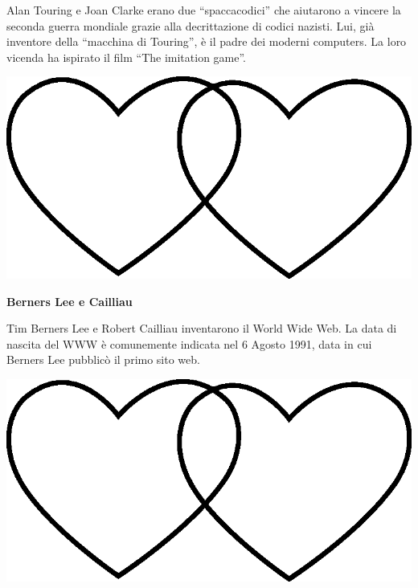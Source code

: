 \documentclass[11pt]{extarticle}
\begin{document}
\begin{center}
Alan Touring e Joan Clarke erano due “spaccacodici” che aiutarono a vincere la seconda guerra mondiale grazie alla decrittazione di codici nazisti. Lui, già inventore della “macchina di Touring”, è il padre dei moderni computers. La loro vicenda ha ispirato il film “The imitation game”.\\
\begin{center}
\includegraphics[scale=0.1]{img/cuori_venn.eps}\\
\end{center}
\end{center}
\vspace*{\fill}
\newpage
\begin{center}
\vspace*{\fill}
{\Huge \textbf{Berners Lee e Cailliau\\}}
\vspace*{\fill}
\end{center}
\newpage
{}
\vspace*{\fill}
\begin{center}
Tim Berners Lee e Robert Cailliau inventarono il World Wide Web. La data di nascita del WWW è comunemente indicata nel 6 Agosto 1991, data in cui Berners Lee pubblicò il primo sito web.\\
\begin{center}
\includegraphics[scale=0.1]{img/cuori_venn.eps}\\
\end{center}
\end{center}
\end{document}
